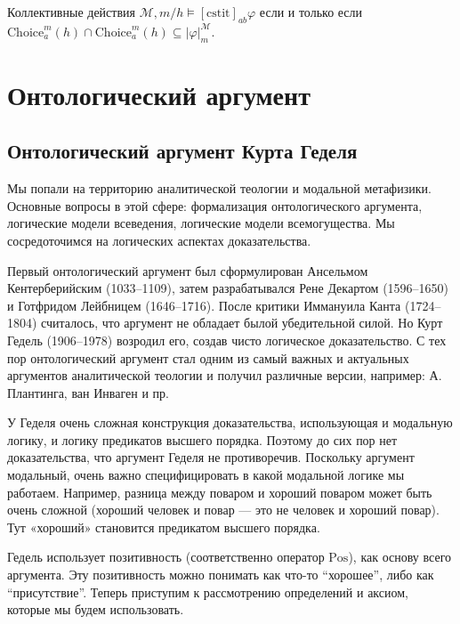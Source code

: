 \documentclass[openany]{book}
\theoremstyle{plain}
\theoremstyle{definition}
\begin{document}
Коллективные действия \(\mathcal{M}, m/h \models [\mathrm{cstit}]_{ab} \varphi\) если и только если \(\mathrm{Choice}_a^m (h) \cap \mathrm{Choice}_a^m (h) \subseteq |\varphi|_m^{\mathcal{M}}\).


\chapter{Онтологический аргумент}

\section{Онтологический аргумент Курта Геделя}

Мы попали на территорию аналитической теологии и модальной метафизики. Основные вопросы в этой сфере: формализация онтологического аргумента, логические модели всеведения, логические модели всемогущества.
Мы сосредоточимся на логических аспектах доказательства.

Первый онтологический аргумент был сформулирован Ансельмом Кентерберийским (1033--1109), затем разрабатывался Рене Декартом (1596--1650) и Готфридом Лейбницем (1646--1716). После критики Иммануила Канта (1724--1804) считалось, что аргумент не обладает былой убедительной силой. Но Курт Гедель (1906--1978) возродил его, создав чисто логическое доказательство. С тех пор онтологический аргумент стал одним из самый важных и актуальных аргументов аналитической теологии и получил различные версии, например: А. Плантинга, ван Инваген и пр.

У Геделя очень сложная конструкция доказательства, использующая и модальную логику, и логику предикатов высшего порядка. Поэтому до сих пор нет доказательства, что аргумент Геделя не противоречив. Поскольку аргумент модальный, очень важно специфицировать в какой модальной логике мы работаем. Например, разница между поваром и хороший поваром может быть очень сложной (хороший человек и повар --- это не человек и хороший повар). Тут «хороший» становится предикатом высшего порядка.

Гедель использует позитивность (соответственно оператор \(\mathrm{Pos}\)), как основу всего аргумента. Эту позитивность можно понимать как что-то ``хорошее'', либо как ``присутствие''. Теперь приступим к рассмотрению определений и аксиом, которые мы будем использовать. 
\end{document}

